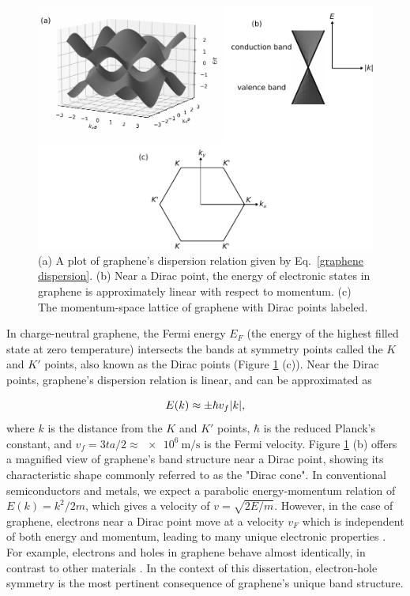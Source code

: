 \documentclass[double,12pt,1in,seploa]{beavtex}
\begin{document}
\begin{figure}
    \includegraphics[width = 1\textwidth]{Graphene band structure 3D.pdf}
    \caption{(a) A plot of graphene's dispersion relation given by Eq.\ \ref{graphene dispersion}. (b) Near a Dirac point, the energy of electronic states in graphene is approximately linear with respect to momentum. (c) The momentum-space lattice of graphene with Dirac points labeled.}
    \label{graphene dispersion plot}
\end{figure}
In charge-neutral graphene, the Fermi energy $E_F$ (the energy of the highest filled state at zero temperature) intersects the bands at symmetry points called the $K$ and $K'$ points, also known as the Dirac points (Figure \ref{graphene dispersion plot} (c)). Near the Dirac points, graphene's dispersion relation is linear, and can be approximated as



\begin{equation}
    E(k) \approx \pm \hbar v_f \abs{k}, \label{linear dispersion of graphene}
\end{equation}
where $k$ is the distance from the $K$ and $K'$ points, $\hbar$ is the reduced Planck's constant, and $v_f = 3ta/2 \approx \SI{e6}{\meter/\second}$ is the Fermi velocity. Figure \ref{graphene dispersion plot} (b) offers a magnified view of graphene's band structure near a Dirac point, showing its characteristic shape commonly referred to as the "Dirac cone". In conventional semiconductors and metals, we expect a parabolic energy-momentum relation of $E(k) = k^2/2m$, which gives a velocity of $v = \sqrt{2E/m}$. However, in the case of graphene, electrons near a Dirac point move at a velocity $v_F$ which is independent of both energy and momentum, leading to many unique electronic properties \cite{castro_neto_electronic_2009}. For example, electrons and holes in graphene behave almost identically, in contrast to other materials \cite{novoselov_electronic_2007,castro_neto_electronic_2009}. In the context of this dissertation, electron-hole symmetry is the most pertinent consequence of graphene’s unique band structure.
\end{document}
